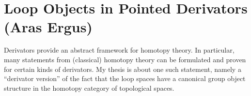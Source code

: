 \section{Loop Objects in Pointed Derivators (Aras Ergus)}

Derivators provide an abstract framework for homotopy
theory. In particular, many statements from (classical) homotopy theory
can be formulated and proven for certain kinds of derivators. My thesis
is about one such statement, namely a ``derivator version'' of the fact that
the loop spaces have a canonical group object structure in the homotopy
category of topological spaces.
